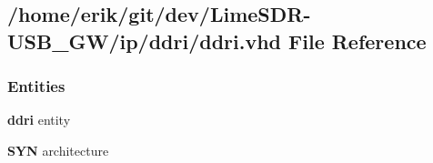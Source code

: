 \subsection{/home/erik/git/dev/\+Lime\+S\+D\+R-\/\+U\+S\+B\+\_\+\+G\+W/ip/ddri/ddri.vhd File Reference}
\label{ddri_8vhd}
\subsubsection*{Entities}
\begin{DoxyCompactItemize}
\item 
{\bf ddri} entity
\item 
{\bf S\+YN} architecture
\end{DoxyCompactItemize}
